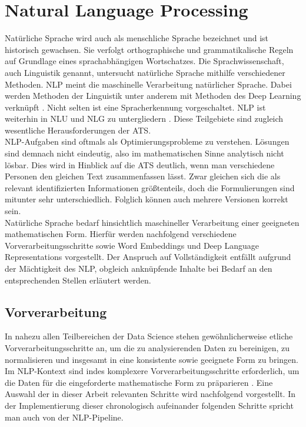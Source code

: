 \chapter{Natural Language Processing}
\thispagestyle{fancy}
\label{chap:Natural Language Processing}

\noindent
Natürliche Sprache wird auch als menschliche Sprache bezeichnet und ist historisch gewachsen. Sie verfolgt orthographische und grammatikalische Regeln auf Grundlage eines sprachabhängigen Wortschatzes. Die Sprachwissenschaft, auch Linguistik genannt, untersucht natürliche Sprache mithilfe verschiedener Methoden. \ac{NLP} meint die maschinelle Verarbeitung natürlicher Sprache. Dabei werden Methoden der Linguistik unter anderem mit Methoden des Deep Learning verknüpft \cite[S.~1]{BIR09}. Nicht selten ist eine Spracherkennung vorgeschaltet. \ac{NLP} ist weiterhin in \ac{NLU} und \ac{NLG} zu untergliedern \cite[S.~27-28]{BIR09}. Diese Teilgebiete sind zugleich wesentliche Herausforderungen der \ac{ATS}.\\

\noindent
\ac{NLP}-Aufgaben sind oftmals als Optimierungsprobleme zu verstehen. Lösungen sind demnach nicht eindeutig, also im mathematischen Sinne analytisch nicht lösbar. Dies wird in Hinblick auf die \ac{ATS} deutlich, wenn man verschiedene Personen den gleichen Text zusammenfassen lässt. Zwar gleichen sich die als relevant identifizierten Informationen größtenteils, doch die Formulierungen sind mitunter sehr unterschiedlich. Folglich können auch mehrere Versionen korrekt sein.\\

\noindent
Natürliche Sprache bedarf hinsichtlich maschineller Verarbeitung einer geeigneten mathematischen Form. Hierfür werden nachfolgend verschiedene Vorverarbeitungsschritte sowie Word Embeddings und Deep Language Representations vorgestellt. Der Anspruch auf Vollständigkeit entfällt aufgrund der Mächtigkeit des \ac{NLP}, obgleich anknüpfende Inhalte bei Bedarf an den entsprechenden Stellen erläutert werden.
\newpage


\section{Vorverarbeitung}
\noindent
In nahezu allen Teilbereichen der Data Science stehen gewöhnlicherweise etliche Vorverarbeitungsschritte an, um die zu analysierenden Daten zu bereinigen, zu normalisieren und insgesamt in eine konsistente sowie geeignete Form zu bringen. Im \ac{NLP}-Kontext sind indes komplexere Vorverarbeitungsschritte erforderlich, um die Daten für die eingeforderte mathematische Form zu präparieren \cite[S.~86]{BIR09}. Eine Auswahl der in dieser Arbeit relevanten Schritte wird nachfolgend vorgestellt. In der Implementierung dieser chronologisch aufeinander folgenden Schritte spricht man auch von der \ac{NLP}-Pipeline.


